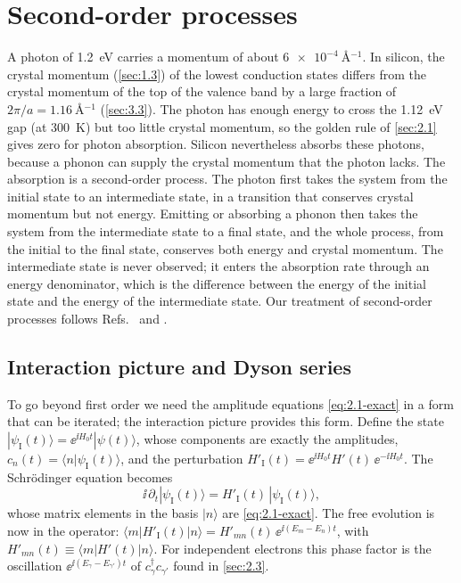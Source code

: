 \section{Second-order processes}\label{sec:2.4}

A photon of \SI{1.2}{eV} carries a momentum of about $\SI{6e-4}{\angstrom^{-1}}$. In silicon, the crystal momentum (\cref{sec:1.3}) of the lowest conduction states differs from the crystal momentum of the top of the valence band by a large fraction of $2\pi/a = \SI{1.16}{\angstrom^{-1}}$ (\cref{sec:3.3}). The photon has enough energy to cross the \SI{1.12}{eV} gap (at \SI{300}{K}) but too little crystal momentum, so the golden rule of \cref{sec:2.1} gives zero for photon absorption. Silicon nevertheless absorbs these photons, because a phonon can supply the crystal momentum that the photon lacks. The absorption is a second-order process. The photon first takes the system from the initial state to an intermediate state, in a transition that conserves crystal momentum but not energy. Emitting or absorbing a phonon then takes the system from the intermediate state to a final state, and the whole process, from the initial to the final state, conserves both energy and crystal momentum. The intermediate state is never observed; it enters the absorption rate through an energy denominator, which is the difference between the energy of the initial state and the energy of the intermediate state. Our treatment of second-order processes follows Refs.~\cite[Chap.~5]{sakurai2017modern} and \cite[Chaps.~I and III]{cohentannoudji1998atom}.

\subsection{Interaction picture and Dyson series}

To go beyond first order we need the amplitude equations \cref{eq:2.1-exact} in a form that can be iterated; the interaction picture provides this form. Define the state $|\psi_{\mathrm{I}}(t)\rangle = \ee^{\ii H_0t}|\psi(t)\rangle$, whose components are exactly the amplitudes, $c_n(t) = \langle n|\psi_{\mathrm{I}}(t)\rangle$, and the perturbation $H'_{\mathrm{I}}(t) = \ee^{\ii H_0t}H'(t)\,\ee^{-\ii H_0t}$. The Schr\"odinger equation becomes
\begin{equation}
  \ii\,\partial_t|\psi_{\mathrm{I}}(t)\rangle = H'_{\mathrm{I}}(t)\,|\psi_{\mathrm{I}}(t)\rangle ,
  \label{eq:2.4-ipicture}
\end{equation}
whose matrix elements in the basis $|n\rangle$ are \cref{eq:2.1-exact}. The free evolution is now in the operator: $\langle m|H'_{\mathrm{I}}(t)|n\rangle = H'_{mn}(t)\,\ee^{\ii(E_m - E_n)t}$, with $H'_{mn}(t) \equiv \langle m|H'(t)|n\rangle$. For independent electrons this phase factor is the oscillation $\ee^{\ii(E_\gamma - E_{\gamma'})t}$ of $c^\dagger_\gamma c_{\gamma'}$ found in \cref{sec:2.3}.


